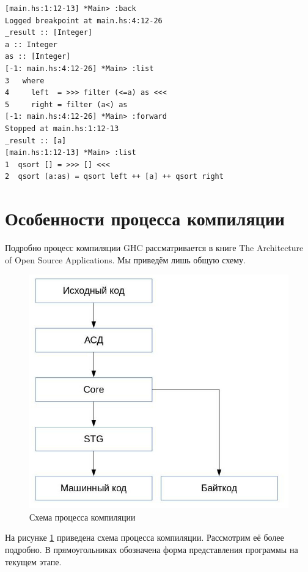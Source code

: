 \documentclass[fontsize=14pt, paper=a4, pagesize, DIV=calc]{scrartcl}
\begin{document}
\begin{ListingEnv}
\caption{}
\begin{lstlisting}[numbers=none]
[main.hs:1:12-13] *Main> :back
Logged breakpoint at main.hs:4:12-26
_result :: [Integer]
a :: Integer
as :: [Integer]
[-1: main.hs:4:12-26] *Main> :list
3   where
4     left  = >>> filter (<=a) as <<<
5     right = filter (a<) as
[-1: main.hs:4:12-26] *Main> :forward
Stopped at main.hs:1:12-13
_result :: [a]
[main.hs:1:12-13] *Main> :list
1  qsort [] = >>> [] <<<
2  qsort (a:as) = qsort left ++ [a] ++ qsort right
\end{lstlisting}
\end{ListingEnv}

\section{Особенности процесса компиляции}

Подробно процесс компиляции GHC рассматривается в книге The Architecture of
Open Source Applications\cite{aosa}. Мы приведём лишь общую схему.

\begin{figure}[H]
\centering
\caption{Схема процесса компиляции}
\label{fig:compilation}
\includegraphics[scale=0.8]{compilation.jpg}
\end{figure}

На рисунке \ref{fig:compilation} приведена схема процесса компиляции.
Рассмотрим её более подробно. В прямоугольниках обозначена форма представления
программы на текущем этапе.
\end{document}
